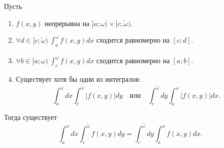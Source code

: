 \begin{theorem}
    Пусть
    \begin{enumerate}
        \item $ f(x,y) $ непрерывна на $ [a;\omega)\times[c;\widetilde{\omega}) $.
        \item $ \forall d \in [c;\widetilde{\omega}) \ \int_{a}^{\omega}f(x,y)dx $ сходится равномерно на $ [c;d] $.
        \item $ \forall b \in [a;\omega) \ \int_{c}^{\widetilde{\omega}}f(x,y)dx $ сходится равномерно на $ [a;b] $.
        \item Существует хотя бы одни из интегралов:
              \[
                  \int_{a}^{\omega}dx \int_{c}^{\widetilde{\omega}}\big|f(x,y)\big|dy \quad \text{или}\quad \int_{c}^{\widetilde{\omega}}dy \int_{a}^{\omega}\big|f(x,y)\big|dx.
              \]
    \end{enumerate}

    Тогда существует
    \[
        \int_{a}^{\omega}dx \int_{c}^{\widetilde{\omega}}f(x,y)dy=\int_{c}^{\widetilde{\omega}}dy \int_{a}^{\omega}f(x,y)dx.
    \]
\end{theorem}